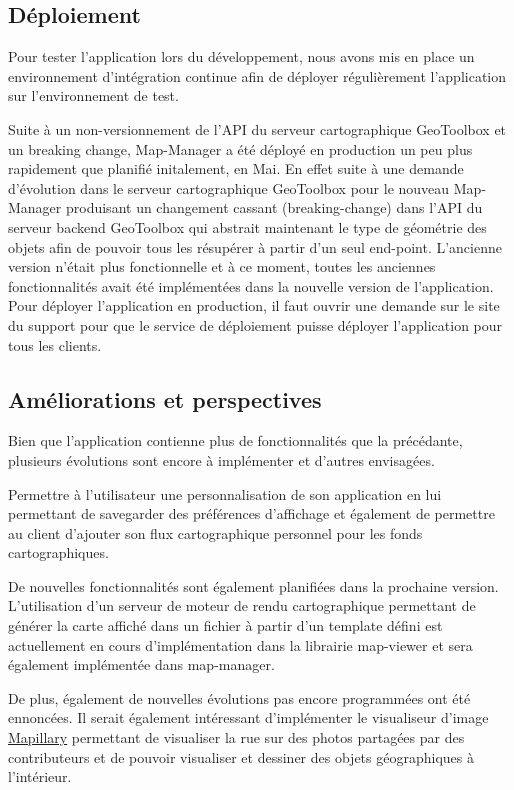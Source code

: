 \documentclass{rapportUHA40}
\begin{document}
\subsection{Déploiement}
Pour tester l'application lors du développement, nous avons mis en place un
environnement d'intégration continue afin de déployer régulièrement
l'application sur l'environnement de test.

Suite à un non-versionnement de l'API du serveur cartographique GeoToolbox et
un breaking change, Map-Manager a été déployé en production un peu plus
rapidement que planifié initalement, en Mai. En effet suite à une demande
d'évolution dans le serveur cartographique GeoToolbox pour le nouveau
Map-Manager produisant un changement cassant (breaking-change) dans l'API du
serveur backend GeoToolbox qui abstrait maintenant le type de géométrie des
objets afin de pouvoir tous les résupérer à partir d'un seul end-point.
L'ancienne version n'était plus fonctionnelle et à ce moment, toutes les
anciennes fonctionnalités avait été implémentées dans la nouvelle version de
l'application. Pour déployer l'application en production, il faut ouvrir une
demande sur le site du support pour que le service de déploiement puisse
déployer l'application pour tous les clients.

\subsection{Améliorations et perspectives}
Bien que l'application contienne plus de fonctionnalités que la précédante,
plusieurs évolutions sont encore à implémenter et d'autres envisagées.

Permettre à l'utilisateur une personnalisation de son application en lui
permettant de savegarder des préférences d'affichage et également de permettre
au client d'ajouter son flux cartographique personnel pour les fonds
cartographiques.

De nouvelles fonctionnalités sont également planifiées dans la prochaine
version. L'utilisation d'un serveur de moteur de rendu cartographique
permettant de générer la carte affiché dans un fichier à partir d'un template
défini est actuellement en cours d'implémentation dans la librairie map-viewer
et sera également implémentée dans map-manager.

De plus, également de nouvelles évolutions pas encore programmées ont été
ennoncées. Il serait également intéressant d'implémenter le visualiseur d'image
\href{https://www.mapillary.com/app/}{Mapillary} permettant de visualiser la
rue sur des photos partagées par des contributeurs et de pouvoir visualiser et
dessiner des objets géographiques à l'intérieur.
\end{document}
